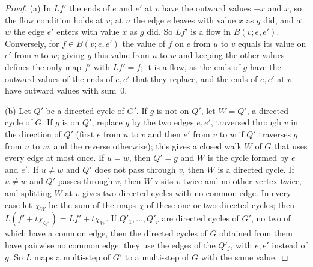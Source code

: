 \documentclass[11pt]{article}
\theoremstyle{definition}
\begin{document}
\begin{proof}
(a) In $Lf'$ the ends of $e$ and $e'$ at $v$ have the outward values $-x$ and $x$, so the flow condition holds at $v$;
at $u$ the edge $e$ leaves with value $x$ as $g$ did, and at $w$ the edge $e'$ enters with value $x$ as $g$
did. So $Lf'$ is a flow in $B(v;e,e')$. Conversely, for $f\in B(v;e,e')$ the value of $f$ on $e$ from $u$ to $v$
equals its value on $e'$ from $v$ to $w$; giving $g$ this value from $u$ to $w$ and keeping the other values defines
the only map $f'$ with $Lf'=f$; it is a flow, as the ends of $g$ have the outward values of the ends of $e,e'$ that they
replace, and the ends of $e,e'$ at $v$ have outward values with sum~$0$.

(b) Let $Q'$ be a directed cycle of $G'$. If $g$ is not on $Q'$, let $W=Q'$, a directed cycle of $G$. If $g$ is on
$Q'$, replace $g$ by the two edges $e,e'$, traversed through $v$ in the direction of $Q'$ (first $e$ from $u$ to $v$
and then $e'$ from $v$ to $w$ if $Q'$ traverses $g$ from $u$ to $w$, and the reverse otherwise); this gives a closed
walk $W$ of $G$ that uses every edge at most once. If $u=w$, then $Q'=g$ and $W$ is the cycle formed by $e$ and $e'$.
If $u\ne w$ and $Q'$ does not pass through $v$, then $W$ is a directed cycle. If $u\ne w$ and $Q'$ passes through $v$,
then $W$ visits $v$ twice and no other vertex twice, and splitting $W$ at $v$ gives two directed cycles with no
common edge. In every case let $\chi_W$ be the sum of the maps $\chi$ of these one or two directed cycles; then
$L(f'+t\chi_{Q'})=Lf'+t\chi_W$. If $Q'_1,\dots,Q'_r$ are directed cycles of $G'$, no two of which have a common edge,
then the directed cycles of $G$ obtained from them have pairwise no common edge: they use the edges of the $Q'_j$,
with $e,e'$ instead of $g$. So $L$ maps a multi-step of $G'$ to a multi-step of $G$ with the same value.
\end{proof}
\end{document}
